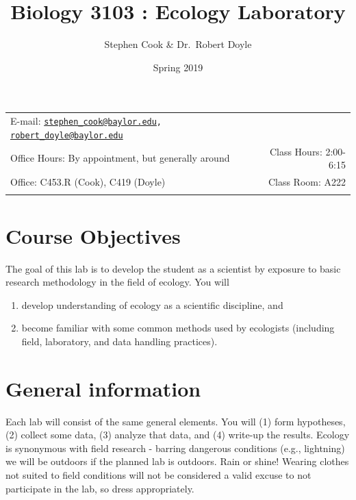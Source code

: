 \documentclass[11pt,]{article}
\title{Biology 3103 : Ecology Laboratory}
\author{Stephen Cook \& Dr.~Robert Doyle}
\date{Spring 2019}
\begin{document}
  

		\maketitle
		
	
		\thispagestyle{firststyle}



	\noindent \begin{tabular*}{\textwidth}{ @{\extracolsep{\fill}} lr @{\extracolsep{\fill}}}


E-mail: \texttt{\href{mailto:stephen_cook@baylor.edu}{\nolinkurl{stephen\_cook@baylor.edu}},
\href{mailto:robert_doyle@baylor.edu}{\nolinkurl{robert\_doyle@baylor.edu}}} \\
Office Hours: By appointment, but generally around  &  Class Hours: 2:00-6:15\\
Office: C453.R (Cook), C419 (Doyle)  & Class Room: A222\\
	&  \\
	\hline
	\end{tabular*}
	
\vspace{2mm}
	


\hypertarget{course-objectives}{%
\section{Course Objectives}\label{course-objectives}}

The goal of this lab is to develop the student as a scientist by
exposure to basic research methodology in the field of ecology. You will

\begin{enumerate}
\def\labelenumi{\arabic{enumi}.}
\item
  develop understanding of ecology as a scientific discipline, and
\item
  become familiar with some common methods used by ecologists (including
  field, laboratory, and data handling practices).
\end{enumerate}

\hypertarget{general-information}{%
\section{General information}\label{general-information}}

Each lab will consist of the same general elements. You will (1) form
hypotheses, (2) collect some data, (3) analyze that data, and (4)
write-up the results. Ecology is synonymous with field research -
barring dangerous conditions (e.g., lightning) we will be outdoors if
the planned lab is outdoors. Rain or shine! Wearing clothes not suited
to field conditions will not be considered a valid excuse to not
participate in the lab, so dress appropriately.
\end{document}
